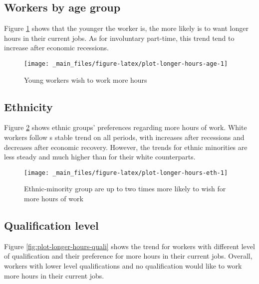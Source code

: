 \documentclass[
]{book}
\begin{document}
\hypertarget{workers-by-age-group-1}{%
\subsection{Workers by age group}\label{workers-by-age-group-1}}

Figure \ref{fig:plot-longer-hours-age} shows that the younger the worker is, the more likely is to want longer hours in their current jobs. As for involuntary part-time, this trend tend to increase after economic recessions.

\begin{figure}

{\centering \texttt{[image: \_main\_files/figure-latex/plot-longer-hours-age-1]} 

}

\caption{Young workers wish to work more hours}\label{fig:plot-longer-hours-age}
\end{figure}

\hypertarget{ethnicity-1}{%
\subsection{Ethnicity}\label{ethnicity-1}}

Figure \ref{fig:plot-longer-hours-eth} shows ethnic groups' preferences regarding more hours of work. White workers follow s stable trend on all periods, with increases after recessions and decreases after economic recovery. However, the trends for ethnic minorities are less steady and much higher than for their white counterparts.

\begin{figure}

{\centering \texttt{[image: \_main\_files/figure-latex/plot-longer-hours-eth-1]} 

}

\caption{Ethnic-minority group are up to two times more likely to wish for more hours of work}\label{fig:plot-longer-hours-eth}
\end{figure}

\hypertarget{qualification-level-1}{%
\subsection{Qualification level}\label{qualification-level-1}}

Figure \ref{fig:plot-longer-hours-quali} shows the trend for workers with different level of qualification and their preference for more hours in their current jobs. Overall, workers with lower level qualifications and no qualification would like to work more hours in their current jobs.
\end{document}
